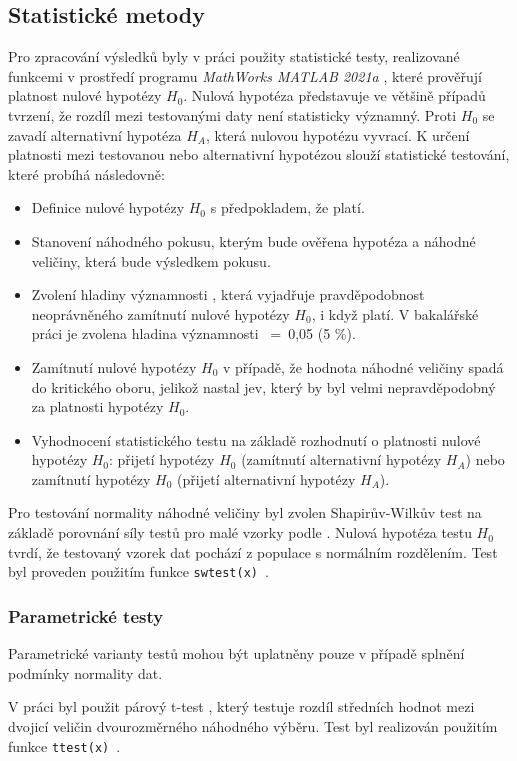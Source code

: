 \subsection{Statistické metody}
\label{section:statistical_methods}
Pro zpracování výsledků byly v práci použity statistické testy, realizované
funkcemi v prostředí programu \textit{MathWorks MATLAB 2021a} \cite{MATLAB},
které prověřují platnost nulové hypotézy $H_0$. Nulová hypotéza představuje ve
většině případů tvrzení, že rozdíl mezi testovanými daty není statisticky
významný. Proti $H_0$ se zavadí alternativní hypotéza $H_A$, která nulovou
hypotézu vyvrací. K určení platnosti mezi testovanou nebo alternativní hypotézou
slouží statistické testování, které probíhá následovně:
\begin{itemize}
    \item Definice nulové hypotézy $H_0$ s předpokladem, že platí.
    \item Stanovení náhodného pokusu, kterým bude ověřena hypotéza a náhodné
          veličiny, která bude výsledkem pokusu.
    \item Zvolení hladiny významnosti \textalpha, která vyjadřuje
          pravděpodobnost neoprávněného zamítnutí nulové hypotézy $H_0$, i když platí.
          V bakalářské práci je zvolena hladina významnosti \textalpha~=~0,05 (5 \%).
    \item Zamítnutí nulové hypotézy $H_0$ v případě, že hodnota náhodné veličiny
          spadá do kritického oboru, jelikož nastal jev, který by byl velmi
          nepravděpodobný za platnosti hypotézy $H_0$.
    \item Vyhodnocení statistického testu na základě rozhodnutí o platnosti
          nulové hypotézy $H_0$: přijetí hypotézy $H_0$ (zamítnutí alternativní
          hypotézy $H_A$) nebo zamítnutí hypotézy $H_0$ (přijetí alternativní hypotézy
          $H_A$).
\end{itemize}

Pro testování normality náhodné veličiny byl zvolen Shapirův-Wilkův test
\cite{wikiSHAPIROWILK} na základě porovnání síly testů pro malé vzorky podle
\cite{Razali2011}. Nulová hypotéza testu $H_0$ tvrdí, že testovaný vzorek dat
pochází z populace s normálním rozdělením. Test byl proveden použitím funkce
\texttt{swtest(x)}~\cite{matlabSWTEST}.

\subsubsection{Parametrické testy}
\label{section:parametric_tests}
Parametrické varianty testů mohou být uplatněny pouze v případě splnění
podmínky normality dat.

V práci byl použit párový t-test \cite{Henry2005}, který testuje rozdíl
středních hodnot mezi dvojicí veličin dvourozměrného náhodného výběru. Test byl
realizován použitím funkce \texttt{ttest(x)}~\cite{matlabTTEST}.